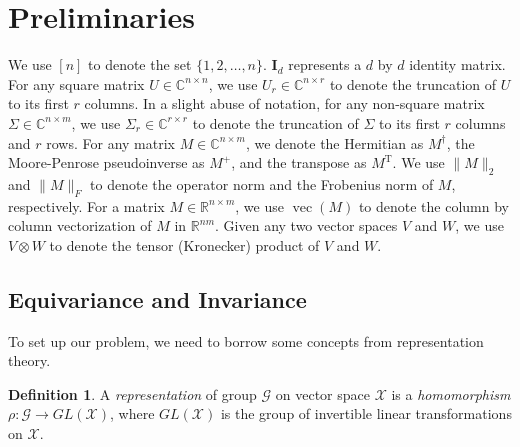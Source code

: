 \documentclass{article}
\newcommand{\T}{\mathrm{T}}
\newcommand{\R}{\mathbb{R}}
\newcommand{\C}{\mathbb{C}}
\theoremstyle{plain}
\theoremstyle{definition}
\newtheorem{definition}[theorem]{Definition}
\theoremstyle{remark}
\theoremstyle{remark}
\begin{document}
\section{Preliminaries}
We use $[n]$ to denote the set $\{1, 2, \ldots, n\}$. 
$\mathbf{I}_{d}$ represents a $d$ by $d$ identity matrix. 
For any square matrix $U \in \C^{n \times n}$, we use $U_r \in \C^{n \times r}$ to denote the truncation of $U$ to its first $r$ columns. 
In a slight abuse of notation, for any non-square matrix $\Sigma \in \C^{n\times m}$, we use $\Sigma_r \in \C^{r \times r}$ to denote the truncation of $\Sigma$ to its first $r$ columns and $r$ rows. 
For any matrix $M \in \C^{n \times m}$, we denote the Hermitian as $M^{\dagger}$, the Moore-Penrose pseudoinverse as $M^{+}$, and the transpose as $M^\T$. 
We use $\|M\|_2$ and $\|M\|_F$ to denote the operator norm and the Frobenius norm of $M$, respectively.
For a matrix $M \in \R^{n\times m}$, we use $\operatorname*{vec}{(M)}$ to denote the column by column vectorization of $M$ in $\R^{nm}$. 
Given any two vector spaces $V$ and $W$, we use $V \otimes W$ to denote the tensor (Kronecker) product of $V$ and $W$.

\subsection{Equivariance and Invariance}
\label{sec:equivariance}

To set up our problem, we need to borrow some concepts from representation theory.
\begin{definition}
  A \textit{representation} of group $\mathcal{G}$ on vector space $\mathcal{X}$ is a \textit{homomorphism} $\rho\colon \mathcal{G} \rightarrow GL(\mathcal{X})$, where $GL(\mathcal{X})$ is the group of invertible linear transformations on $\mathcal{X}$. 
\end{definition}
\end{document}
